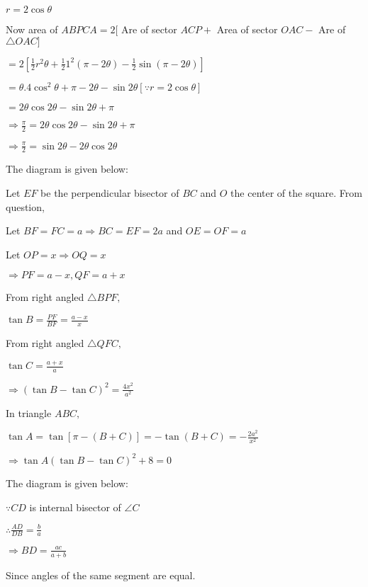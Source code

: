   $r = 2\cos\theta$

  Now area of $ABPCA = 2[$ Are of sector $ACP +$ Area of sector $OAC -$ Are of $\triangle OAC]$

  $= 2\left[\frac{1}{2}r^2\theta + \frac{1}{2}1^2(\pi - 2\theta) - \frac{1}{2}\sin(\pi -2\theta)\right]$

  $=\theta. 4\cos^2\theta + \pi - 2\theta - \sin2\theta [\because r = 2\cos\theta]$

  $= 2\theta\cos2\theta - \sin2\theta + \pi$

  $\Rightarrow \frac{\pi}{2} = 2\theta\cos2\theta - \sin2\theta + \pi$

  $\Rightarrow \frac{\pi}{2} = \sin2\theta - 2\theta\cos2\theta$

\item The diagram is given below:

  \startplacefigure
    \externalfigure[18_20.pdf]
  \stopplacefigure

  Let $EF$ be the perpendicular bisector of $BC$ and $O$ the center of the square. From question,

  Let $BF = FC = a \Rightarrow BC = EF = 2a$ and $OE=OF = a$

  Let $OP = x \Rightarrow OQ = x$

  $\Rightarrow PF = a - x, QF = a + x$

  From right angled $\triangle BPF,$

  $\tan B = \frac{PF}{BF} = \frac{a - x}{x}$

  From right angled $\triangle QFC,$

  $\tan C = \frac{a + x}{a}$

  $\Rightarrow (\tan B - \tan C)^2 = \frac{4x^2}{a^2}$

  In triangle $ABC,$

  $\tan A = \tan[\pi - (B + C)] = -\tan(B + C) = -\frac{2a^2}{x^2}$

  $\Rightarrow \tan A(\tan B - \tan C)^2 + 8 = 0$

\item The diagram is given below:

  \startplacefigure
    \externalfigure[18_21.pdf]
  \stopplacefigure

  $\because CD$ is internal bisector of $\angle C$

  $\therefore \frac{AD}{DB} = \frac{b}{a}$

  $\Rightarrow BD = \frac{ac}{a + b}$

  Since angles of the same segment are equal.

